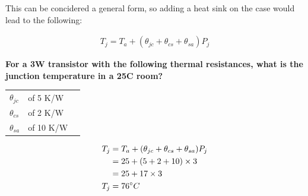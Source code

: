 This can be concidered a general form, so adding a heat sink on the case would lead to the following:

\begin{gather*}
T_j = T_a + (\theta_{jc} + \theta_{cs} + \theta_{sa})P_j
\end{gather*}

\begin{framed}
\textbf{For a 3W transistor with the following thermal resistances, what is the junction temperature in a 25\degree C room?}
\begin{table}[H]
	\centering
    \begin{tabular}{lll}
    $\theta_{jc}$ & of 5 K/W \\
    $\theta_{cs}$ & of 2 K/W \\
    $\theta_{sa}$ & of 10 K/W
    \end{tabular}
\end{table}
\begin{align*}
T_j &= T_a + (\theta_{jc} + \theta_{cs} + \theta_{sa})P_j \\
    &= 25 + (5 + 2 + 10) \times 3 \\
    &= 25 + 17 \times 3 \\
T_j &= 76\degree C
\end{align*}
\end{framed}